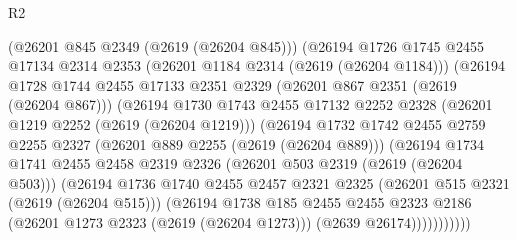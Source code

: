 \begin{lexlean}{R2}
\begin{coremodule}
                          (@26201 @845 @2349 (@2619 (@26204 @845)))
                          (@26194
                            @1726
                            @1745
                            @2455
                            @17134
                            @2314
                            @2353
                            (@26201 @1184 @2314 (@2619 (@26204 @1184)))
                            (@26194
                              @1728
                              @1744
                              @2455
                              @17133
                              @2351
                              @2329
                              (@26201 @867 @2351 (@2619 (@26204 @867)))
                              (@26194
                                @1730
                                @1743
                                @2455
                                @17132
                                @2252
                                @2328
                                (@26201 @1219 @2252 (@2619 (@26204 @1219)))
                                (@26194
                                  @1732
                                  @1742
                                  @2455
                                  @2759
                                  @2255
                                  @2327
                                  (@26201 @889 @2255 (@2619 (@26204 @889)))
                                  (@26194
                                    @1734
                                    @1741
                                    @2455
                                    @2458
                                    @2319
                                    @2326
                                    (@26201 @503 @2319 (@2619 (@26204 @503)))
                                    (@26194
                                      @1736
                                      @1740
                                      @2455
                                      @2457
                                      @2321
                                      @2325
                                      (@26201 @515 @2321 (@2619 (@26204 @515)))
                                      (@26194
                                        @1738
                                        @185
                                        @2455
                                        @2455
                                        @2323
                                        @2186
                                        (@26201 @1273 @2323 (@2619 (@26204 @1273)))
                                        (@2639 @26174)))))))))))

\end{coremodule}
\end{lexlean}
